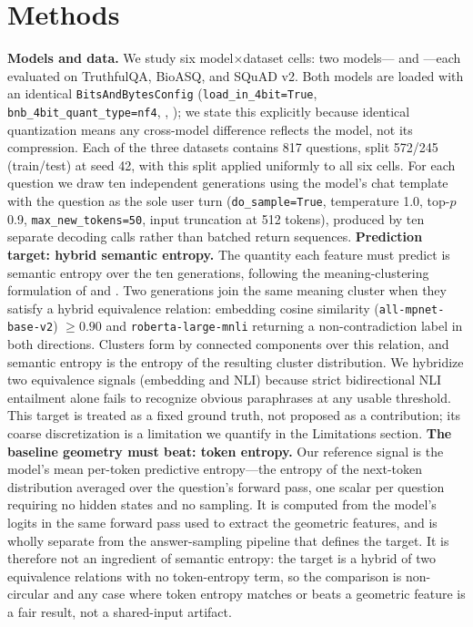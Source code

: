\documentclass[11pt]{article}
\begin{document}
\section{Methods}
\label{sec:methods}
\textbf{Models and data.} We study six model$\times$dataset cells: two models---\texttt{} and \texttt{}---each evaluated on TruthfulQA, BioASQ, and SQuAD v2. Both models are loaded with an identical \texttt{BitsAndBytesConfig} (\texttt{load\_in\_4bit=True}, \texttt{bnb\_4bit\_quant\_type=nf4}, \texttt{}, \texttt{}); we state this explicitly because identical quantization means any cross-model difference reflects the model, not its compression. Each of the three datasets contains 817 questions, split 572/245 (train/test) at seed 42, with this split applied uniformly to all six cells. For each question we draw ten independent generations using the model's chat template with the question as the sole user turn (\texttt{do\_sample=True}, temperature 1.0, top-$p$ 0.9, \texttt{max\_new\_tokens=50}, input truncation at 512 tokens), produced by ten separate decoding calls rather than batched return sequences.
\textbf{Prediction target: hybrid semantic entropy.} The quantity each feature must predict is semantic entropy over the ten generations, following the meaning-clustering formulation of \citet{kuhn2023semantic} and \citet{farquhar2024detecting}. Two generations join the same meaning cluster when they satisfy a hybrid equivalence relation: embedding cosine similarity (\texttt{all-mpnet-base-v2}) $\geq 0.90$ and \texttt{roberta-large-mnli} returning a non-contradiction label in both directions. Clusters form by connected components over this relation, and semantic entropy is the entropy of the resulting cluster distribution. We hybridize two equivalence signals (embedding and NLI) because strict bidirectional NLI entailment alone fails to recognize obvious paraphrases at any usable threshold. This target is treated as a fixed ground truth, not proposed as a contribution; its coarse discretization is a limitation we quantify in the Limitations section.
\textbf{The baseline geometry must beat: token entropy.} Our reference signal is the model's mean per-token predictive entropy---the entropy of the next-token distribution averaged over the question's forward pass, one scalar per question requiring no hidden states and no sampling. It is computed from the model's logits in the same forward pass used to extract the geometric features, and is wholly separate from the answer-sampling pipeline that defines the target. It is therefore not an ingredient of semantic entropy: the target is a hybrid of two equivalence relations with no token-entropy term, so the comparison is non-circular and any case where token entropy matches or beats a geometric feature is a fair result, not a shared-input artifact.
\end{document}
